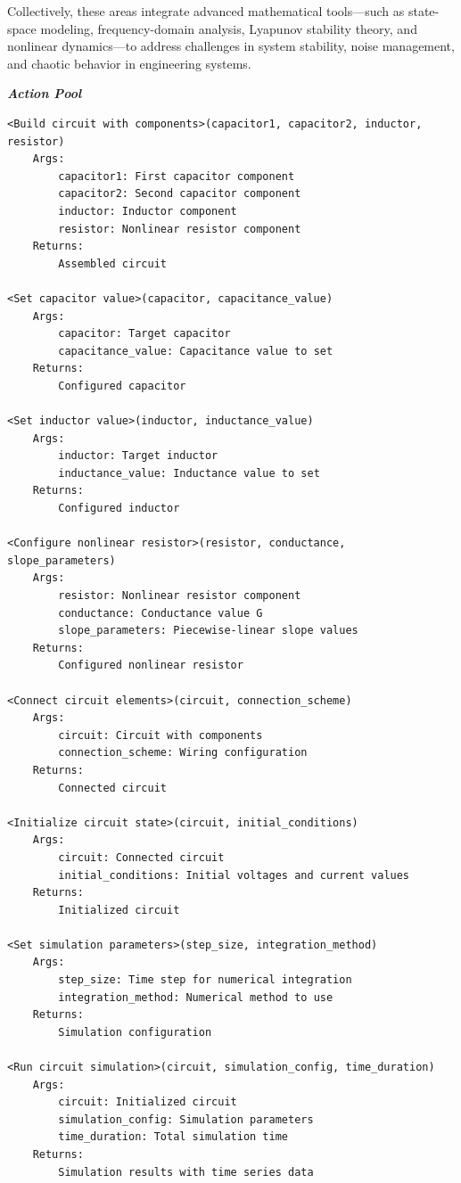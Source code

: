 \begin{tcolorbox}[
    breakable,
    title=Example of Wet Experiment in Physics,
    colback=LighterGray,
    colframe=DeepPurple,
    colbacktitle=DeepPurple,
    coltitle=White,
]
Collectively, these areas integrate advanced mathematical tools—such as state-space modeling, frequency-domain analysis, Lyapunov stability theory, and nonlinear dynamics—to address challenges in system stability, noise management, and chaotic behavior in engineering systems.

\textbf{\emph{\textcolor{DeepPurple}{Action Pool}}}

\begin{lstlisting}
<Build circuit with components>(capacitor1, capacitor2, inductor, resistor)
    Args:
        capacitor1: First capacitor component
        capacitor2: Second capacitor component
        inductor: Inductor component
        resistor: Nonlinear resistor component
    Returns:
        Assembled circuit

<Set capacitor value>(capacitor, capacitance_value)
    Args:
        capacitor: Target capacitor
        capacitance_value: Capacitance value to set
    Returns:
        Configured capacitor

<Set inductor value>(inductor, inductance_value)
    Args:
        inductor: Target inductor
        inductance_value: Inductance value to set
    Returns:
        Configured inductor

<Configure nonlinear resistor>(resistor, conductance, slope_parameters)
    Args:
        resistor: Nonlinear resistor component
        conductance: Conductance value G
        slope_parameters: Piecewise-linear slope values
    Returns:
        Configured nonlinear resistor

<Connect circuit elements>(circuit, connection_scheme)
    Args:
        circuit: Circuit with components
        connection_scheme: Wiring configuration
    Returns:
        Connected circuit

<Initialize circuit state>(circuit, initial_conditions)
    Args:
        circuit: Connected circuit
        initial_conditions: Initial voltages and current values
    Returns:
        Initialized circuit

<Set simulation parameters>(step_size, integration_method)
    Args:
        step_size: Time step for numerical integration
        integration_method: Numerical method to use
    Returns:
        Simulation configuration

<Run circuit simulation>(circuit, simulation_config, time_duration)
    Args:
        circuit: Initialized circuit
        simulation_config: Simulation parameters
        time_duration: Total simulation time
    Returns:
        Simulation results with time series data


\end{lstlisting}
\end{tcolorbox}
